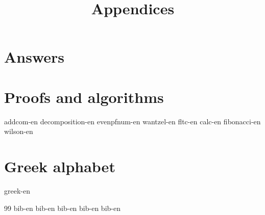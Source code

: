 \documentclass[b5paper]{article}
\begin{document}
\title{Appendices}

\maketitle
\fi


\chapter{Answers}
\label{ch:answers}
\shipoutAnswer

\chapter{Proofs and algorithms}

{addcom-en}
{decomposition-en}
{evenpfnum-en}
{wantzel-en}
{fltc-en}
{calc-en}
{fibonacci-en}
{wilson-en}

\chapter{Greek alphabet} \label{ch:greek-letters}
{greek-en}

\markboth{\bibname}{}

\begin{thebibliography}{99}
  {bib-en}
  {bib-en}
  {bib-en}
  {bib-en}
  {bib-en}
\end{thebibliography}

\ifx\wholebook\relax \else
\expandafter\enddocument
\fi
\end{document}
